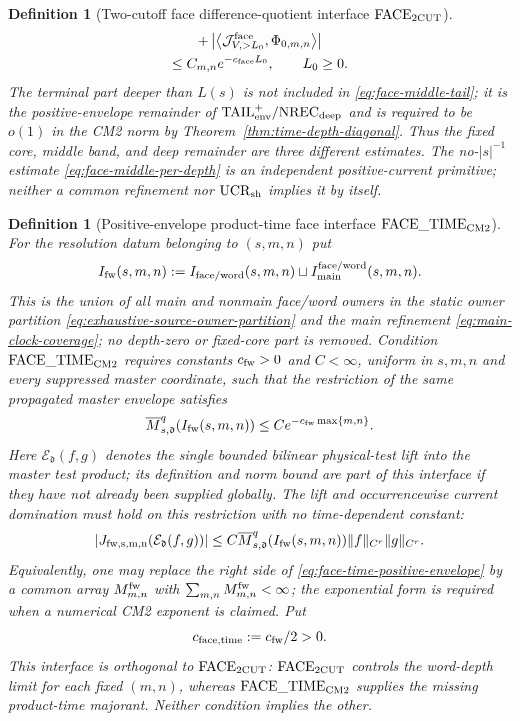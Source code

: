 \documentclass[11pt]{article}
\newtheorem{definition}[theorem]{Definition}
\begin{document}
\begin{definition}[Two-cutoff face difference-quotient interface
$\mathrm{FACE}_{\rm 2CUT}$]
\begin{multline}
 +\left|\left\langle
 \mathcal J_{V,>L_0}^{\rm face},\Phi_{0,m,n}
 \right\rangle\right|\\
 \le C_{m,n}e^{-c_{\rm face}L_0},\qquad L_0\ge0.
\end{multline}
The terminal part deeper than $L(s)$ is not included in
\eqref{eq:face-middle-tail}; it is the positive-envelope remainder of
$\mathrm{TAIL}_{\rm env}^{+}/\mathrm{NREC}_{\rm deep}$ and is required to
be $o(1)$ in the CM2 norm by
Theorem~\ref{thm:time-depth-diagonal}.  Thus the fixed core, middle band, and
deep remainder are three different estimates.  The no-$|s|^{-1}$ estimate
\eqref{eq:face-middle-per-depth} is an independent positive-current
primitive; neither a common refinement nor $\mathrm{UCR}_{\rm sh}$ implies
it by itself.
\end{definition}

\begin{definition}[Positive-envelope product-time face interface
$\mathrm{FACE\_TIME}_{\rm CM2}$]
\label{def:face-time-cm2}
For the resolution datum belonging to $(s,m,n)$ put
\[
 I_{\rm fw}(s,m,n):=I_{\rm face/word}(s,m,n)
 \sqcup I_{\rm main}^{\rm face/word}(s,m,n).
\]
This is the union of \emph{all} main and nonmain face/word owners in
the static owner partition \eqref{eq:exhaustive-source-owner-partition} and
the main refinement \eqref{eq:main-clock-coverage}; no depth-zero or
fixed-core part is removed.
Condition $\mathrm{FACE\_TIME}_{\rm CM2}$ requires constants
$c_{\rm fw}>0$ and $C<\infty$, uniform in $s,m,n$ and every suppressed
master coordinate, such that the restriction of the same propagated master
envelope satisfies
\begin{equation}
\label{eq:face-time-positive-envelope}
 \overline M_{s,\mathfrak d}^{q}(I_{\rm fw}(s,m,n))
 \le C e^{-c_{\rm fw}\max\{m,n\}}.
\end{equation}
Here $\mathcal E_{\mathfrak d}(f,g)$ denotes the single bounded bilinear physical-test lift
into the master test product; its definition and norm bound are part of this
interface if they have not already been supplied globally.  The lift and
occurrencewise current domination must hold on this restriction with no
time-dependent constant:
\begin{equation}
\label{eq:face-time-test-lift}
 |J_{\rm fw,s,m,n}(\mathcal E_{\mathfrak d}(f,g))|
 \le C\overline M_{s,\mathfrak d}^{q}(I_{\rm fw}(s,m,n))
 \|f\|_{C^r}\|g\|_{C^r}.
\end{equation}
Equivalently, one may replace the right side of
\eqref{eq:face-time-positive-envelope} by a common array $M_{m,n}^{\rm fw}$
with $\sum_{m,n}M_{m,n}^{\rm fw}<\infty$; the exponential form is required
when a numerical CM2 exponent is claimed.  Put
\begin{equation}
\label{eq:face-time-rate}
 c_{\rm face,time}:=c_{\rm fw}/2>0.
\end{equation}
This interface is orthogonal to $\mathrm{FACE}_{\rm 2CUT}$:
$\mathrm{FACE}_{\rm 2CUT}$ controls the word-depth limit for each fixed
$(m,n)$, whereas $\mathrm{FACE\_TIME}_{\rm CM2}$ supplies the missing
product-time majorant.  Neither condition implies the other.
\end{definition}
\end{document}
